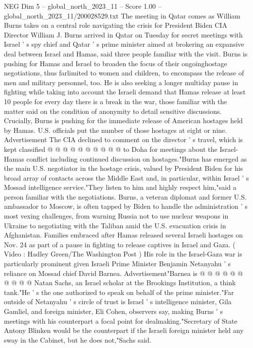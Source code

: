 \begin{textsample}{NEG Dim 5 – global\_north\_2023\_11 – Score 1.00 – global\_north\_2023\_11/200028529.txt}  \label{ex:f5_neg_036}
The meeting in Qatar comes as William Burns takes on a central role navigating the crisis for President Biden CIA Director William J.
Burns arrived in Qatar on Tuesday for secret meetings with Israel ' s spy chief and Qatar ' s prime minister aimed at brokering an expansive deal between Israel and Hamas, said three people familiar with the visit.
Burns is pushing for Hamas and Israel to broaden the focus of their ongoinghostage negotiations, thus farlimited to women and children, to encompass the release of men and military personnel, too.
He is also seeking a longer multiday pause in fighting while taking into account the Israeli demand that Hamas release at least 10 people for every day there is a break in the war, those familiar with the matter said on the condition of anonymity to detail sensitive discussions.
Crucially, Burns is pushing for the immediate release of American hostages held by Hamas.
U.S. officials put the number of those hostages at eight or nine.
Advertisement The CIA declined to comment on the director ' s travel, which is kept classified @ @ @ @ @ @ @ @ @ @ to Doha for meetings about the Israel-Hamas conflict including continued discussion on hostages."Burns has emerged as the main U.S. negotiator in the hostage crisis, valued by President Biden for his broad array of contacts across the Middle East and, in particular, within Israel ' s Mossad intelligence service."They listen to him and highly respect him,"said a person familiar with the negotiations.
Burns, a veteran diplomat and former U.S. ambassador to Moscow, is often tapped by Biden to handle the administration ' s most vexing challenges, from warning Russia not to use nuclear weapons in Ukraine to negotiating with the Taliban amid the U.S. evacuation crisis in Afghanistan.
Families embraced after Hamas released several Israeli hostages on Nov. 24 as part of a pause in fighting to release captives in Israel and Gaza. ( Video : Hadley Green/The Washington Post ) His role in the Israel-Gaza war is particularly prominent given Israeli Prime Minister Benjamin Netanyahu ' s reliance on Mossad chief David Barnea.
Advertisement"Barnea is @ @ @ @ @ @ @ @ @ @ Natan Sachs, an Israel scholar at the Brookings Institution, a think tank."He ' s the one authorized to speak on behalf of the prime minister."Far outside of Netanyahu ' s circle of trust is Israel ' s intelligence minister, Gila Gamliel, and foreign minister, Eli Cohen, observers say, making Burns ' s meetings with his counterpart a focal point for dealmaking."Secretary of State Antony Blinken would be the counterpart if the Israeli foreign minister held any sway in the Cabinet, but he does not,"Sachs said.

\end{textsample}
